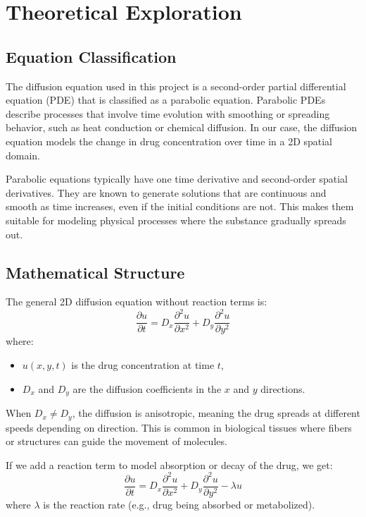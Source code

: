 \documentclass[11pt, a4paper]{article}
\begin{document}
\section{Theoretical Exploration}

\subsection{Equation Classification}
The diffusion equation used in this project is a second-order partial differential equation (PDE) that is classified as a parabolic equation. Parabolic PDEs describe processes that involve time evolution with smoothing or spreading behavior, such as heat conduction or chemical diffusion. In our case, the diffusion equation models the change in drug concentration over time in a 2D spatial domain.

Parabolic equations typically have one time derivative and second-order spatial derivatives. They are known to generate solutions that are continuous and smooth as time increases, even if the initial conditions are not. This makes them suitable for modeling physical processes where the substance gradually spreads out.

\subsection{Mathematical Structure}
The general 2D diffusion equation without reaction terms is:
\[
\frac{\partial u}{\partial t} = D_x \frac{\partial^2 u}{\partial x^2} + D_y \frac{\partial^2 u}{\partial y^2}
\]
where:
\begin{itemize}
    \item \( u(x, y, t) \) is the drug concentration at time \(t\),
    \item \( D_x \) and \( D_y \) are the diffusion coefficients in the \(x\) and \(y\) directions.
\end{itemize}

When \( D_x \neq D_y \), the diffusion is anisotropic, meaning the drug spreads at different speeds depending on direction. This is common in biological tissues where fibers or structures can guide the movement of molecules.

If we add a reaction term to model absorption or decay of the drug, we get:
\[
\frac{\partial u}{\partial t} = D_x \frac{\partial^2 u}{\partial x^2} + D_y \frac{\partial^2 u}{\partial y^2} - \lambda u
\]
where \( \lambda \) is the reaction rate (e.g., drug being absorbed or metabolized).
\end{document}
